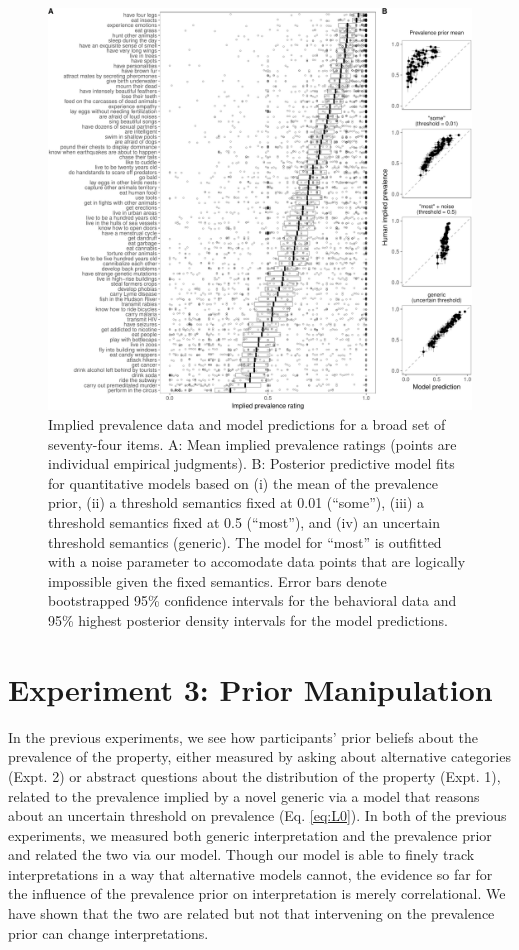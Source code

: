 \documentclass[floatsintext,man]{apa6}
\theoremstyle{definition}
\theoremstyle{definition}
\theoremstyle{definition}
\theoremstyle{remark}
\begin{document}
\begin{figure}
\centering
\includegraphics{genint_files/figure-latex/genint-modelingResults-1.pdf}
\caption{\label{fig:genint-modelingResults}Implied prevalence data and model
predictions for a broad set of seventy-four items. A: Mean implied
prevalence ratings (points are individual empirical judgments). B:
Posterior predictive model fits for quantitative models based on (i) the
mean of the prevalence prior, (ii) a threshold semantics fixed at 0.01
(\enquote{some}), (iii) a threshold semantics fixed at 0.5
(\enquote{most}), and (iv) an uncertain threshold semantics (generic).
The model for \enquote{most} is outfitted with a noise parameter to
accomodate data points that are logically impossible given the fixed
semantics. Error bars denote bootstrapped 95\% confidence intervals for
the behavioral data and 95\% highest posterior density intervals for the
model predictions.}
\end{figure}

\section{Experiment 3: Prior
Manipulation}\label{experiment-3-prior-manipulation}

In the previous experiments, we see how participants' prior beliefs
about the prevalence of the property, either measured by asking about
alternative categories (Expt. 2) or abstract questions about the
distribution of the property (Expt. 1), related to the prevalence
implied by a novel generic via a model that reasons about an uncertain
threshold on prevalence (Eq. \ref{eq:L0}). In both of the previous
experiments, we measured both generic interpretation and the prevalence
prior and related the two via our model. Though our model is able to
finely track interpretations in a way that alternative models cannot,
the evidence so far for the influence of the prevalence prior on
interpretation is merely correlational. We have shown that the two are
related but not that intervening on the prevalence prior can change
interpretations.
\end{document}
